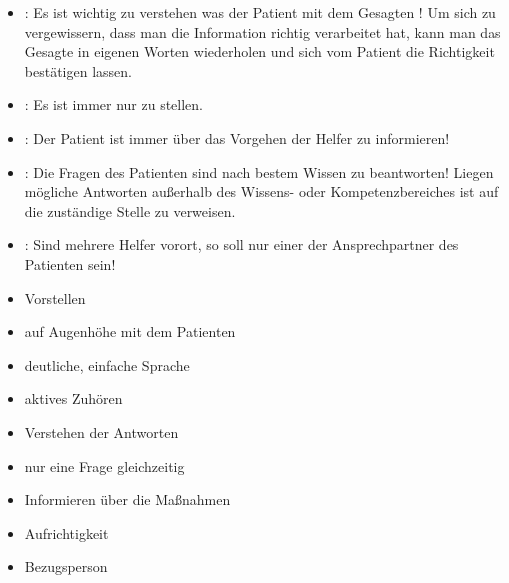 {\begin{itemize}
    Negativbeispiel: \begin{quote}\end{quote}
    \item {}: Es ist wichtig zu verstehen was der
    Patient mit dem Gesagten ! Um sich zu vergewissern, dass man die
    Information richtig verarbeitet hat, kann man das Gesagte in
    eigenen Worten wiederholen und sich vom Patient die Richtigkeit bestätigen
    lassen.
    \item {}: Es ist immer nur  zu stellen.
    \item {}: Der Patient ist immer über das Vorgehen der Helfer
    zu informieren!
    \item {}: Die Fragen des
    Patienten sind nach bestem Wissen zu beantworten!  Liegen mögliche Antworten außerhalb des Wissens-
    oder Kompetenzbereiches ist auf die zuständige Stelle zu verweisen.
    \item {}: Sind mehrere Helfer
    vorort, so soll nur einer der Ansprechpartner des
    Patienten sein!\label{topic:einer-redet}
\end{itemize}
}{
\begin{itemize}
  \item Vorstellen
  \item auf Augenhöhe mit dem Patienten
  \item deutliche, einfache Sprache
  \item aktives Zuhören
  \item Verstehen der Antworten
  \item nur eine Frage gleichzeitig
  \item Informieren über die Maßnahmen
  \item Aufrichtigkeit
  \item Bezugsperson
\end{itemize}
}{}{}{}



